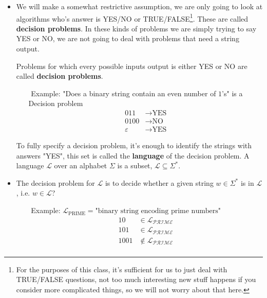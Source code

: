 \documentclass{article}
\begin{document}
\begin{itemize}
    \item We will make a somewhat restrictive assumption, we are only going to look at algorithms who's answer is YES/NO or TRUE/FALSE\footnote{For the purposes of this class, it's sufficient for us to just deal with TRUE/FALSE questions, not too much interesting new stuff happens if you consider more complicated things, so we will not worry about that here.}. These are called \textbf{decision problems}. In these kinds of problems we are simply trying to say YES or NO, we are not going to deal with problems that need a string output. 
    \begin{tcolorbox} [title= Definition:, colback=black!10!white]
        Problems for which every possible inputs output is either YES or NO are called \textbf{decision problems}.
    \end{tcolorbox}
    \begin{itemize}
        \item[$ $] Example: "Does a binary string contain an even number of $1$'s" is a Decision problem
        \begin{align*}
            011 &\rightarrow \text{YES}\\ 
            0100 &\rightarrow \text{NO}\\
            \varepsilon &\rightarrow \text{YES}
        \end{align*}  
    \end{itemize}
    \begin{tcolorbox} [title= Definition:, colback=black!10!white]
        To fully specify a decision problem, it's enough to identify the strings with answers "YES", this set is called the \textbf{language}\footnotemark{} of the decision problem. A language $\mathcal{L}$ over an alphabet $\Sigma$ is a subset, $\mathcal{L}\subseteq\Sigma^*$.
    \end{tcolorbox}
    \item The decision problem for $\mathcal{L}$ is to decide whether a given string $w\in\Sigma^*$ is in $\mathcal{L}$, i.e. $w\in\mathcal{L}$?
    \begin{itemize}
        \item [$ $] Example: $\mathcal{L}_{\text{PRIME}}=\text{"binary string encoding prime numbers"}$
        \begin{align*}
            10 &\in\mathcal{L_\text{PRIME}}\\
            101 &\in\mathcal{L_\text{PRIME}}\\
            1001 &\notin\mathcal{L_\text{PRIME}}\\
        \end{align*}
    \end{itemize}
\end{itemize}
\end{document}
